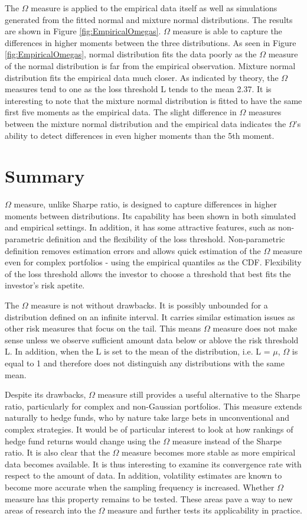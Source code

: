 \documentclass[paper=a4, fontsize=11pt]{scrartcl}
\begin{document}
The $\Omega$ measure is applied to the empirical data itself as well as simulations generated from the fitted normal
and mixture normal distributions. The results are shown in Figure \ref{fig:EmpiricalOmegas}. $\Omega$ measure is able to capture the differences
in higher moments between the three distributions. As seen in Figure \ref{fig:EmpiricalOmegas}, normal distribution fits the data poorly as
the $\Omega$ measure of the normal distribution is far from the empirical observation. Mixture normal distribution
fits the empirical data much closer. As indicated by theory, the $\Omega$ measures tend to one as the loss
threshold L tends to the mean 2.37. It is interesting to note that the mixture normal distribution is fitted to have
the same first five moments as the empirical data. The slight difference in $\Omega$ measures between the mixture
normal distribution and the empirical data indicates the $\Omega$'s ability to  detect differences in even higher
moments than the 5th moment.

\newpage
\section{Summary}
$\Omega$ measure, unlike Sharpe ratio, is designed to capture differences in higher moments between distributions.
Its capability has been shown in both simulated and empirical settings. In addition, it has some attractive features,
such as non-parametric definition and the flexibility of the loss threshold. Non-parametric definition removes
estimation errors and allows quick estimation of the $\Omega$ measure even for complex portfolios - using the
empirical quantiles as the CDF. Flexibility of the loss threshold allows the investor to choose a threshold that
best fits the investor's risk apetite.

The $\Omega$ measure is not without drawbacks. It is possibly unbounded for a distribution defined on an infinite interval.
It carries similar estimation issues as other risk measures that focus on the tail. This means $\Omega$ measure does
not make sense unless we observe sufficient amount data below or ablove the risk threshold L. In addition, when the
L is set to the mean of the distribution, i.e. L = $\mu$, $\Omega$ is equal to 1 and therefore does not distinguish
any distributions with the same mean.

Despite its drawbacks, $\Omega$ measure still provides a useful alternative to the Sharpe ratio, particularly for
complex and non-Gaussian portfolios. This measure extends naturally to hedge funds, who by nature take large bets in
unconventional and complex strategies. It would be of particular interest to look at how rankings of hedge fund
returns would change using the $\Omega$ measure instead of the Sharpe ratio. It is also clear that the $\Omega$ measure
becomes more stable as more empirical data becomes available. It is thus interesting to examine its convergence rate
with respect to the amount of data. In addition, volatility estimates are known to become more accurate when the
sampling frequency is increased. Whether $\Omega$ measure has this property remains to be tested.
These areas pave a way to new areas of research into the $\Omega$ measure and further tests its applicability in practice.
\end{document}
